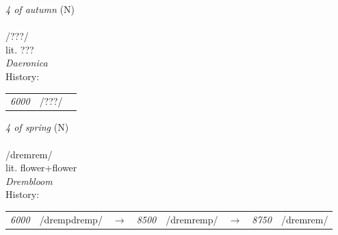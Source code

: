 \vspace{15pt}
\begin{nopagebreak}
 \textit{4 of autumn} (N)\\
\\
\noindent /???/\\
\noindent lit. ???\\
\noindent \textit{Daeronica}\\


\noindent History:

\vspace{-0pt}
\hspace{40pt}
\begin{tabular}{ccc}
\textit{6000} & /???/& \\
\end{tabular}

\vspace{20pt}\hline

\end{nopagebreak}
\filbreak



\vspace{15pt}
\begin{nopagebreak}
 \textit{4 of spring} (N)\\
\\
\noindent /dr{\textprimstress}emrem/\\
\noindent lit. flower+flower\\
\noindent \textit{Drembloom}\\


\noindent History:

\vspace{-0pt}
\hspace{40pt}
\begin{tabular}{ccc}
\textit{6000} & /drempdremp/&$\rightarrow$ & \textit{8500} & /dremremp/&$\rightarrow$ & \textit{8750} & /dremrem/& \\
\end{tabular}

\vspace{20pt}\hline

\end{nopagebreak}
\filbreak



